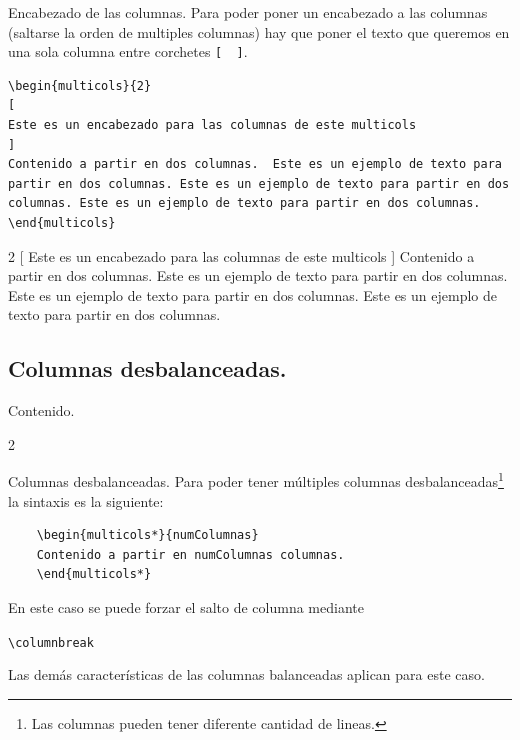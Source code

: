 \documentclass[dvipsnames,xcolor, handout]{beamer}
\theoremstyle{plain}
\theoremstyle{definition}
\begin{document}
\begin{frame}[fragile]{Encabezado de las columnas.}
Para poder poner un encabezado a las columnas (saltarse la orden de multiples columnas) hay que poner el texto que queremos en una sola columna entre corchetes \verb![  ]!.\pause 
\begin{footnotesize}
\begin{verbatim}
\begin{multicols}{2}
[
Este es un encabezado para las columnas de este multicols
]
Contenido a partir en dos columnas.  Este es un ejemplo de texto para
partir en dos columnas. Este es un ejemplo de texto para partir en dos
columnas. Este es un ejemplo de texto para partir en dos columnas. 
\end{multicols}
\end{verbatim}
\end{footnotesize}
\pause
\begin{footnotesize}
\begin{multicols}{2}
[
Este es un encabezado para las columnas de este multicols
]
Contenido a partir en dos columnas.  Este es un ejemplo de texto para
partir en dos columnas. Este es un ejemplo de texto para partir en dos
columnas. Este es un ejemplo de texto para partir en dos columnas. 
    \end{multicols}
\end{footnotesize}

\end{frame}

\subsection{Columnas desbalanceadas.}
\begin{frame}{Contenido.}
 \begin{footnotesize}
\vspace*{-1cm}
\begin{multicols}{2}
  \tableofcontents[currentsubsection]
\end{multicols}
\end{footnotesize}
\end{frame}

\begin{frame}[fragile]{Columnas desbalanceadas.}
Para poder tener múltiples columnas desbalanceadas\footnote{Las columnas pueden tener diferente cantidad de lineas.} la sintaxis es la siguiente:
\begin{verbatim}
    \begin{multicols*}{numColumnas}
    Contenido a partir en numColumnas columnas.
    \end{multicols*}
\end{verbatim}
En este caso se puede forzar el salto de columna mediante 

\verb!\columnbreak!

Las demás características de las columnas balanceadas aplican para este caso.
\end{frame}
\end{document}
